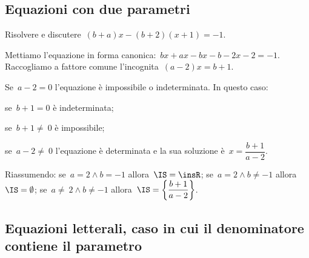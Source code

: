 \ovalbox{\risolvii \ref{ese:20.34}, \ref{ese:20.35}, \ref{ese:20.36}, \ref{ese:20.37}, \ref{ese:20.38}, \ref{ese:20.39}, \ref{ese:20.40}}

\subsection{Equazioni con due parametri}

\begin{exrig}
 \begin{esempio}
Risolvere e discutere~$(b+a)x-(b+2)(x+1)=-1$.

Mettiamo l'equazione in forma canonica:~$bx+ax-bx-b-2x-2=-1$.
Raccogliamo a fattore comune l'incognita~$(a-2)x=b+1$.
\begin{itemize*}
 \item Se~$a-2=0$ l'equazione è impossibile o indeterminata. In questo caso:
  \begin{itemize*}
   \item se~$b+1=0$ è indeterminata;
   \item se~$b+1\neq~0$ è impossibile;
  \end{itemize*}
 \item se~$a-2\neq~0$ l'equazione è determinata e la sua soluzione è~$x=\dfrac{b+1}{a-2}$.
\end{itemize*}
 \end{esempio}
Riassumendo:
se~$a=2\wedge b=-1$ allora~$\IS=\insR$; se~$a=2\wedge b\neq -1$ allora~$\IS=\emptyset$; se~$a\neq~2\wedge b\neq -1$ allora~$\IS=\left\{\dfrac{b+1}{a-2}\right\}$.
\end{exrig}

\ovalbox{\risolvii \ref{ese:20.41}, \ref{ese:20.42}, \ref{ese:20.43}}

\subsection{Equazioni letterali, caso in cui il denominatore contiene il parametro}

